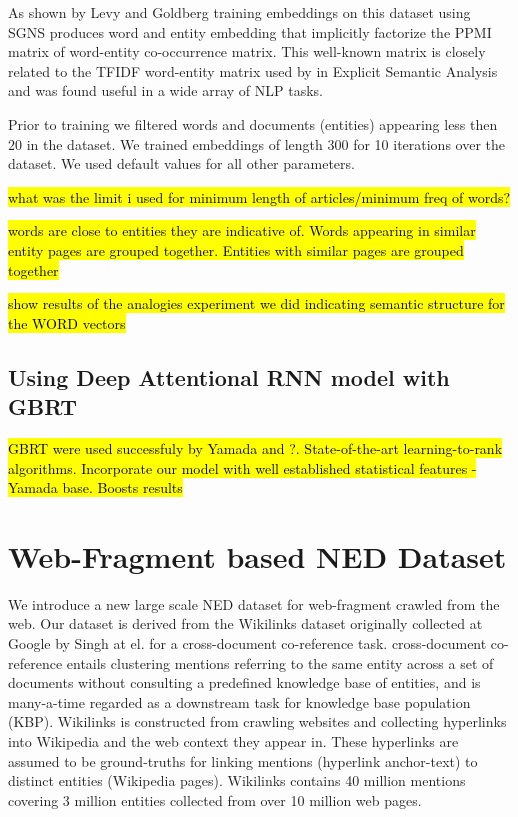 \documentclass[11pt]{article}
\begin{document}
As shown by Levy and Goldberg \cite{levy2014neural} training embeddings on this dataset using SGNS produces word and entity embedding that implicitly factorize the PPMI matrix of word-entity co-occurrence matrix. This well-known matrix is closely related to the TFIDF word-entity matrix used by \cite{gabrilovich2007computing} in Explicit Semantic Analysis and was found useful in a wide array of NLP tasks. 

Prior to training we filtered words and documents (entities) appearing less then $20$ in the dataset. We trained embeddings of length 300 for 10 iterations over the dataset. We used default values for all other parameters.

\hl{what was the limit i used for minimum length of articles/minimum freq of words?}

\hl{words are close to entities they are indicative of. Words appearing in similar entity pages are grouped together. Entities with similar pages are grouped together}

\hl{show results of the analogies experiment we did indicating semantic structure for the WORD vectors}

\subsection{Using Deep Attentional RNN model with GBRT}

\hl{GBRT were used successfuly by Yamada and ?. State-of-the-art learning-to-rank algorithms. Incorporate our model with well established statistical features - Yamada base. Boosts results }

\section{Web-Fragment based NED Dataset}
We introduce a new large scale NED dataset for web-fragment crawled from the web. Our dataset is derived from the Wikilinks dataset originally collected at Google by Singh at el. \cite{singh12:wiki-links} for a cross-document co-reference task. cross-document co-reference entails clustering mentions referring to the same entity across a set of documents without consulting a predefined knowledge base of entities, and is many-a-time regarded as a downstream task for knowledge base population (KBP). Wikilinks is constructed from crawling websites and collecting hyperlinks into Wikipedia and the web context they appear in. These hyperlinks are assumed to be ground-truths for linking mentions (hyperlink anchor-text) to distinct entities (Wikipedia pages). Wikilinks contains 40 million mentions covering 3 million entities collected from over 10 million web pages.
\end{document}
